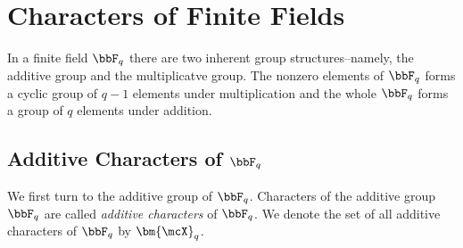 \section{Characters of Finite Fields}
In a finite field $\bbF_q$ there are two inherent group structures--namely, the additive group and the multiplicatve group. The nonzero elements of $\bbF_q$ forms a cyclic group of $q-1$ elements under multiplication and the whole $\bbF_q$ forms a group of $q$ elements under addition.

\subsection{Additive Characters of \texorpdfstring{$\bbF_q$}{Fq}}
We first turn to the additive group of $\bbF_q$. Characters of the additive group $\bbF_q$ are called \emph{additive characters} of $\bbF_q$. We denote the set of all additive characters of $\bbF_q$ by $\bm{\mcX}_q$. 

